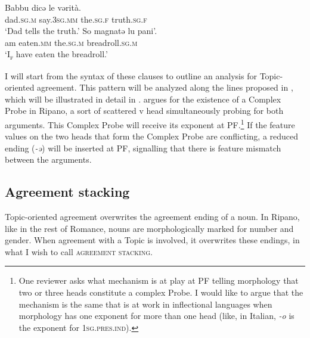 \documentclass[output=paper
,modfonts
,nonflat]{langsci/langscibook}
\begin{document}
\begin{exe} 
	\ex \label{ex-dalessandro:31}\citet[107]{Mancini1988/1997} \xlist
	\ex 
	\gll Babbu   dicə   le   vərità.\\
	dad.\textsc{sg.m}   say.\textsc{3sg.mm} the.\textsc{sg.f}   truth.\textsc{sg.f}\\
	\glt`Dad tells the truth.'
	\ex
	\gll So   magnatə   lu     pani’.\\
	am   eaten.\textsc{mm}   the.\textsc{sg.m}   breadroll.\textsc{sg.m}\\ 
	\glt `I\textsc{\textsubscript{f}} have eaten the breadroll.'
	\endxlist
\end{exe}
I will start from the syntax of these clauses to outline an analysis for Topic-oriented agreement. This pattern will be analyzed along the lines proposed in \citet{D`Alessandro2017}, which will be illustrated in detail in . \citet{D`Alessandro2017} argues for the existence of a Complex Probe in Ripano, a sort of scattered v head simultaneously probing for both arguments. This Complex Probe will receive its exponent at PF.\footnote{One reviewer asks what mechanism is at play at PF telling morphology that two or three heads constitute a complex Probe. I would like to argue that the mechanism is the same that is at work in inflectional languages when morphology has one exponent for more than one head (like, in Italian, \textit{-o} is the exponent for \textsc{1sg.pres.ind}).} If the feature values on the two heads that form the Complex Probe are conflicting, a reduced ending (\textit{-ə}) will be inserted at PF, signalling that there is feature mismatch between the arguments.  
\subsection{Agreement stacking} \label{sec-dalessandro:4.5}
Topic-oriented agreement overwrites the agreement ending of a noun. In Ripano, like in the rest of Romance, nouns are morphologically marked for number and gender. When agreement with a Topic is involved, it overwrites these endings, in what I wish to call \textsc{agreement stacking}.
\end{document}
